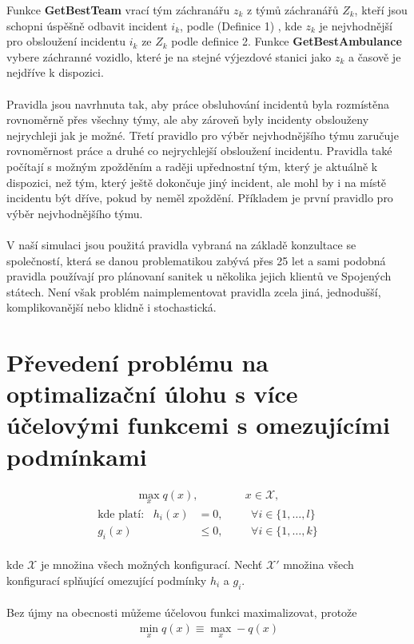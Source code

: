 Funkce \textbf{GetBestTeam} vrací tým záchranářu $z_k$ z týmů záchranářů $Z_k$, kteří jsou schopni úspěšně odbavit incident $i_k$, podle (Definice 1)
, kde $z_k$ je nejvhodnější pro obsloužení incidentu $i_k$ ze $Z_k$ podle definice 2. %
Funkce \textbf{GetBestAmbulance} vybere záchranné vozidlo, které je na stejné výjezdové stanici jako $z_k$ a časově je nejdříve k dispozici.
\\
\\
Pravidla jsou navrhnuta tak, aby práce obsluhování incidentů byla rozmístěna rovnoměrně přes všechny týmy, ale aby zároveň byly incidenty obslouženy nejrychleji jak je možné.
Třetí pravidlo pro výběr nejvhodnějšího týmu zaručuje rovnoměrnost práce a druhé co nejrychlejší obsloužení incidentu.
Pravidla také počítají s možným zpožděním a raději upřednostní tým, který je aktuálně k dispozici, než tým, který ještě dokončuje jiný incident, ale mohl by i na místě incidentu
být dříve, pokud by neměl zpoždění. Příkladem je první pravidlo pro výběr nejvhodnějšího týmu.
\\
\\
V naší simulaci jsou použitá pravidla vybraná na základě konzultace se společností, která se danou problematikou zabývá přes 25 let a sami podobná pravidla používají pro plánovaní sanitek
u několika jejich klientů ve Spojených státech.
Není však problém naimplementovat pravidla zcela jiná, jednodušší, komplikovanější nebo klidně i stochastická.

\section{Převedení problému na optimalizační úlohu s více účelovými funkcemi s omezujícími podmínkami}

\begin{definice}
  \begin{align}
    \max_{x} q(x), \hspace{50pt} x \in \mathcal{X},
  \end{align}
  \begin{align}
    \text{kde platí:} \hspace{10pt} h_i(x) &= 0, \hspace{20pt} &\forall i \in \{ 1, \dots, l \} \\
                     g_i(x) &\leq 0, \hspace{20pt} &\forall i \in \{ 1, \dots, k \}
  \end{align}
  \\
  kde $\mathcal{X}$ je množina všech možných konfigurací.
  Nechť $\mathcal{X}'$ množina všech konfigurací splňující omezující podmínky $h_i$ a $g_i$.
  \\
  \\
  Bez újmy na obecnosti můžeme účelovou funkci maximalizovat, protože
  \begin{align}
    \min_{x} q(x) \equiv \max_{x} -q(x)
  \end{align}
  \\
\end{definice}

